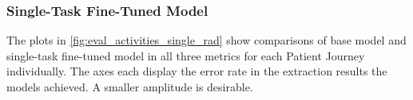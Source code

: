 \subsubsection{Single-Task Fine-Tuned Model}\label{sec:eval_single}
The plots in \autoref{fig:eval_activities_single_rad} show comparisons of base model and single-task fine-tuned model in all three metrics for each Patient Journey individually. The axes each display the error rate in the extraction results the models achieved. A smaller amplitude is desirable.\\
\begin{figure}
  \centering

\end{figure}
